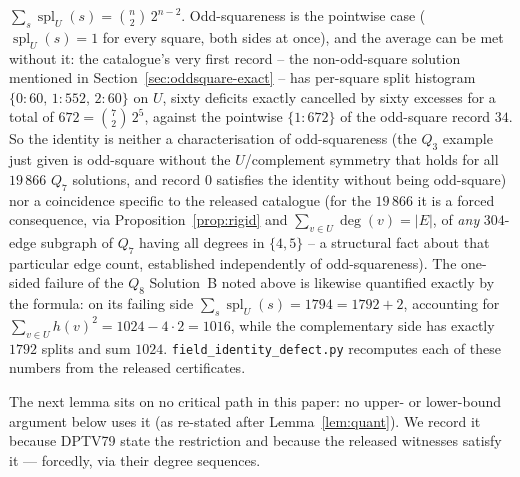 \documentclass[12pt,a4paper]{article}
\theoremstyle{definition}
\begin{document}
$\sum_s\operatorname{spl}_U(s)=\binom n2\,2^{n-2}$. Odd-squareness is
the pointwise case ($\operatorname{spl}_U(s)=1$ for every square, both
sides at once), and the average can be met without it: the catalogue's
very first record -- the non-odd-square solution mentioned in
Section~\ref{sec:oddsquare-exact} -- has per-square split histogram
$\{0{:}60,\,1{:}552,\,2{:}60\}$ on $U$, sixty deficits exactly
cancelled by sixty excesses for a total of $672=\binom72\,2^{5}$,
against the pointwise $\{1{:}672\}$ of the odd-square record $34$. So
the identity is neither a characterisation of odd-squareness (the $Q_3$
example just given is odd-square without the $U$/complement symmetry that
holds for all $19\,866$ $Q_7$ solutions, and record $0$ satisfies the
identity without being odd-square) nor a coincidence specific to the
released catalogue (for the $19\,866$ it is a forced consequence, via
Proposition~\ref{prop:rigid} and $\sum_{v\in U}\deg(v)=|E|$, of
\emph{any} $304$-edge subgraph of $Q_7$ having all degrees in $\{4,5\}$
-- a structural fact about that particular edge count, established
independently of odd-squareness). The one-sided failure of the $Q_8$
Solution~B noted above is likewise quantified exactly by the formula: on
its failing side $\sum_s\operatorname{spl}_U(s)=1794=1792+2$, accounting
for $\sum_{v\in U}h(v)^2=1024-4\cdot2=1016$, while the complementary
side has exactly $1792$ splits and sum $1024$.
\texttt{field\_identity\_defect.py} recomputes each of these numbers
from the released certificates.

The next lemma sits on no critical path in this paper: no upper- or
lower-bound argument below uses it (as re-stated after
Lemma~\ref{lem:quant}). We record it because DPTV79 state the
restriction and because the released witnesses satisfy it --- forcedly,
via their degree sequences.
\end{document}
